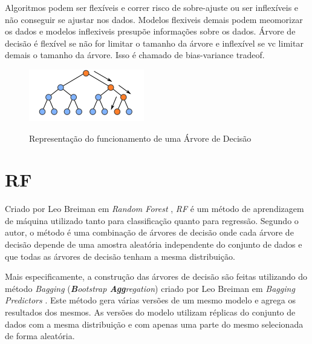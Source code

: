  Algoritmos podem ser flexíveis e correr risco de sobre-ajuste ou ser inflexíveis e não conseguir se ajustar nos dados. Modelos flexiveis demais podem  meomorizar os dados e modelos inflexiveis presupõe informações sobre os dados.
 Árvore de decisão é flexível se não for limitar o tamanho da árvore e inflexível se vc limitar demais o tamanho da árvore. Isso é chamado de bias-variance tradeof.
 
\begin{figure}[h]
    \centering
    \includegraphics[scale=1.5]{monography/img/decision_tree.png}
    \label{figure:rf}
    \caption{Representação do funcionamento de uma Árvore de Decisão\footnotemark}
\end{figure}


\section{\acrfull{RF}}

Criado por Leo Breiman em \textit{Random Forest} \cite{Breiman:2001:RF:570181.570182}, \textit{\acrshort{RF}} é um método de aprendizagem de máquina utilizado tanto para classificação quanto para regressão. Segundo o autor, o método é uma combinação de árvores de decisão onde cada árvore de decisão depende de uma amostra aleatória independente do conjunto de dados e que todas as árvores de decisão tenham a mesma distribuição. 

Mais especificamente, a construção das árvores de decisão são feitas utilizando do método \textit{Bagging} (\textit{\textbf{B}ootstrap \textbf{Agg}regation}) criado por Leo Breiman em \textit{Bagging Predictors} \cite{Breiman:1996:BP:231986.231989}. Este método gera várias versões de um mesmo modelo e agrega os resultados dos mesmos. As versões do modelo utilizam réplicas do conjunto de dados com a mesma distribuição e com apenas uma parte do mesmo selecionada de forma aleatória.

